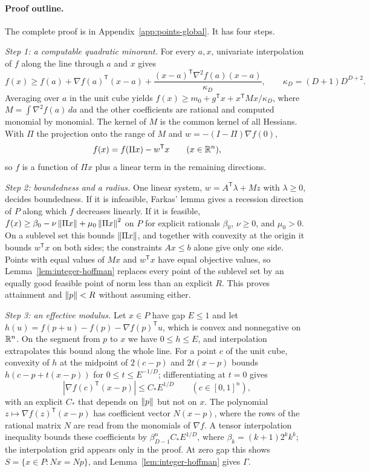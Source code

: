 \paragraph{Proof outline.}
The complete proof is in Appendix~\ref{app:points-global}. It has four
steps.

\emph{Step 1: a computable quadratic minorant.} For every $a,x$, univariate
interpolation of $f$ along the line through $a$ and $x$ gives
\[
 f(x)\ge f(a)+\nabla f(a)^{\mathsf T}(x-a)+\frac{(x-a)^{\mathsf T}\nabla^2f(a)
 (x-a)}{\kappa_D},\qquad\kappa_D=(D+1)D^{D+2}.
\]
Averaging over $a$ in the unit cube yields
$f(x)\ge m_0+g^{\mathsf T}x+x^{\mathsf T}Mx/\kappa_D$, where
$M=\int\nabla^2f(a)\,da$ and the other coefficients are rational and
computed monomial by monomial. The kernel of $M$ is the common kernel of all
Hessians. With $\Pi$ the projection onto the range of $M$ and
$w=-(I-\Pi)\nabla f(0)$,
\[
 f(x)=f(\Pi x)-w^{\mathsf T}x\qquad(x\in\mathbb R^n),
\]
so $f$ is a function of $\Pi x$ plus a linear term in the remaining
directions.

\emph{Step 2: boundedness and a radius.} One linear system,
$w=A^{\mathsf T}\lambda+Mz$ with $\lambda\ge0$, decides boundedness. If it is
infeasible, Farkas' lemma gives a recession direction of $P$ along which $f$
decreases linearly. If it is feasible,
$f(x)\ge\beta_0-\nu\left\lVert\Pi x\right\rVert+\mu_0\left\lVert\Pi x\right\rVert^2$ on $P$ for explicit
rationals $\beta_0$, $\nu\ge0$, and $\mu_0>0$. On a sublevel set this bounds $\left\lVert\Pi
x\right\rVert$, and together with convexity at the origin it bounds $w^{\mathsf T}x$ on
both sides; the constraints $Ax\le b$ alone give only one side. Points with
equal values of $Mx$ and $w^{\mathsf T}x$ have equal objective values, so
Lemma~\ref{lem:integer-hoffman} replaces every point of the sublevel set by
an equally good feasible point of norm less than an explicit $R$. This
proves attainment and $\left\lVert p\right\rVert<R$ without assuming either.

\emph{Step 3: an effective modulus.} Let $x\in P$ have gap $E\le1$ and let
$h(u)=f(p+u)-f(p)-\nabla f(p)^{\mathsf T}u$, which is convex and nonnegative
on $\mathbb R^n$. On the segment from $p$ to $x$ we have $0\le h\le E$, and
interpolation extrapolates this bound along the whole line. For a point $c$
of the unit cube, convexity of $h$ at the midpoint of $2(c-p)$ and
$2t(x-p)$ bounds $h(c-p+t(x-p))$ for $0\le t\le E^{-1/D}$; differentiating at
$t=0$ gives
\[
 |\nabla f(c)^{\mathsf T}(x-p)|\le C_*E^{1/D}\qquad(c\in[0,1]^n),
\]
with an explicit $C_*$ that depends on $\left\lVert p\right\rVert$ but not on $x$. The
polynomial $z\mapsto\nabla f(z)^{\mathsf T}(x-p)$ has coefficient vector
$N(x-p)$, where the rows of the rational matrix $N$ are read from the
monomials of $\nabla f$. A tensor interpolation inequality bounds these
coefficients by $\beta_{D-1}^nC_*E^{1/D}$, where $\beta_k=(k+1)2^kk^k$; the
interpolation grid appears only in the proof. At zero gap this shows $S=\{x\in P:Nx=Np\}$, and
Lemma~\ref{lem:integer-hoffman} gives $\Gamma$.

